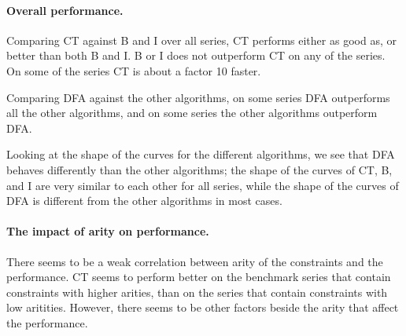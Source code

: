 \documentclass[a4paper,11pt]{article}
\numberwithin{equation}{section}
\begin{document}

\paragraph{Overall performance.}
Comparing CT against B and I over all series, CT performs either as good as,
or better than both B and I. 
B or I does not outperform CT on any of the series.
On some of the series CT is about a factor 10 faster.

Comparing DFA against the other algorithms, on some series DFA outperforms
all the other algorithms, and on some series the other algorithms outperform
DFA.

Looking at the shape of the curves for the different algorithms,
we see that DFA behaves differently than the other algorithms; the shape of the curves
of CT, B, and I are very similar to each other for all series, while the shape of the
curves of DFA is different from the other algorithms in most cases.

\paragraph{The impact of arity on performance.}
There seems to be a weak correlation between arity of the constraints and the performance.
CT seems to perform better on the benchmark series that contain
constraints with higher arities, than on the series that 
contain constraints with low aritities.
However, there seems to be other factors
beside the arity that affect the performance.



\end{document}
